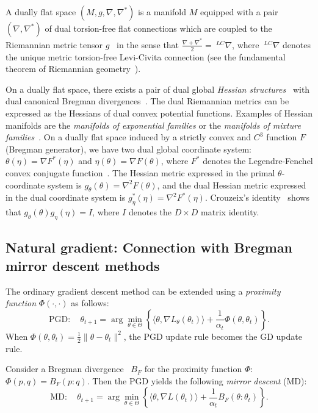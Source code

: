 \documentclass[11pt]{article}
\def\leftsup#1{\ ^{#1}}
\def\inner#1#2{\langle #1,#2\rangle}
\begin{document}
A dually flat space $(M,g,\nabla,\nabla^*)$ is a manifold $M$ equipped with a pair $(\nabla,\nabla^*)$ of dual torsion-free flat connections which are coupled to the Riemannian metric tensor $g$~\cite{IG-2016,EIG-2018,DFS-2019} in the sense that
 $\frac{\nabla+\nabla^*}{2}=\leftsup{LC}\nabla$, where 
$\leftsup{LC}\nabla$ denotes the unique metric torsion-free Levi-Civita connection 
(see the fundamental theorem of Riemannian geometry~\cite{EIG-2018}).

On a dually flat space, there exists a pair of dual global {\em Hessian structures}~\cite{Shima-2007} with dual canonical Bregman divergences~\cite{Bregman-1967,IG-2016}. The dual Riemannian metrics can be expressed as the Hessians of dual convex potential functions. 
Examples of Hessian manifolds are the {\em manifolds of exponential families} or the {\em manifolds of mixture families}~\cite{MCIG-2019}.
On a dually flat space induced by a strictly convex and $C^3$ function $F$ (Bregman generator), we have two dual global coordinate system:
$\theta(\eta)=\nabla F^*(\eta)$ and $\eta(\theta)=\nabla F(\theta)$, where $F^*$ denotes the Legendre-Fenchel convex conjugate function~\cite{LegendreIG-2010,CR-2013}.
The Hessian metric expressed in the primal $\theta$-coordinate system is $g_\theta(\theta)=\nabla^2 F(\theta)$, and the dual Hessian metric expressed
 in the dual coordinate system is $g^*_\eta(\eta)=\nabla^2 F^*(\eta)$. 
Crouzeix's identity~\cite{Crouzeix-1977,EIG-2018} shows that $g_\theta(\theta)g_\eta(\eta)=I$, where $I$ denotes the $D\times D$ matrix identity.


\subsection{Natural gradient: Connection with  Bregman mirror descent methods} 

The ordinary gradient descent method can be extended using a  {\em proximity function} $\Phi(\cdot,\cdot)$ as follows:
\begin{equation}
\mathrm{PGD}:\quad \theta_{t+1} = \arg \min_{\theta\in\Theta} \left\{ \inner{\theta}{\nabla L_\theta(\theta_t)}+\frac{1}{\alpha_t} \Phi(\theta,\theta_t)\right\}.
\end{equation}
When $\Phi(\theta,\theta_t)=\frac{1}{2}\|\theta-\theta_t\|^2$, the PGD update rule becomes the GD update rule.

Consider a Bregman divergence~\cite{Bregman-1967} $B_F$ for the proximity function $\Phi$: $\Phi(p,q)=B_F(p:q)$.
Then the PGD yields the following {\em mirror descent} (MD):
\begin{equation}
\mathrm{MD}:\quad\theta_{t+1} = \arg \min_{\theta\in\Theta} \left\{ \inner{\theta}{\nabla L(\theta_t)}+\frac{1}{\alpha_t} B_F(\theta:\theta_t)\right\}.
\end{equation}
\end{document}

